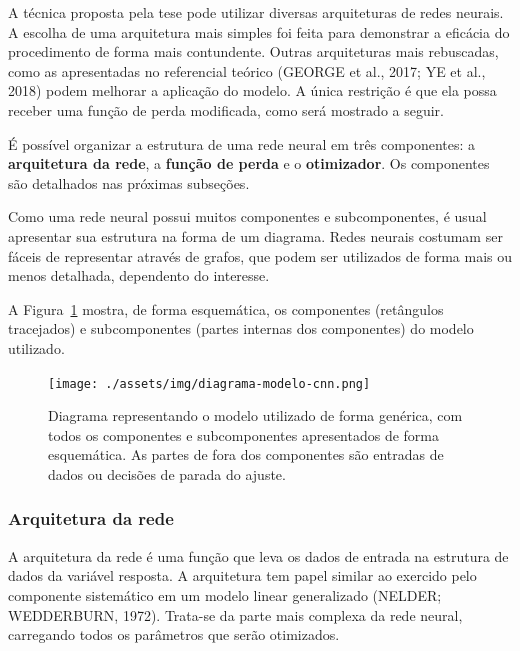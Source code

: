 \documentclass[12pt,twoside,brazilian]{book}
\begin{document}
A técnica proposta pela tese pode utilizar diversas arquiteturas de
redes neurais. A escolha de uma arquitetura mais simples foi feita para
demonstrar a eficácia do procedimento de forma mais contundente. Outras
arquiteturas mais rebuscadas, como as apresentadas no referencial
teórico (GEORGE et al., 2017; YE et al., 2018) podem melhorar a
aplicação do modelo. A única restrição é que ela possa receber uma
função de perda modificada, como será mostrado a seguir.

É possível organizar a estrutura de uma rede neural em três componentes:
a \textbf{arquitetura da rede}, a \textbf{função de perda} e o
\textbf{otimizador}. Os componentes são detalhados nas próximas
subseções.

Como uma rede neural possui muitos componentes e subcomponentes, é usual
apresentar sua estrutura na forma de um diagrama. Redes neurais costumam
ser fáceis de representar através de grafos, que podem ser utilizados de
forma mais ou menos detalhada, dependento do interesse.

A Figura~\ref{fig-diagrama-modelo-cnn} mostra, de forma esquemática, os
componentes (retângulos tracejados) e subcomponentes (partes internas
dos componentes) do modelo utilizado.

\begin{figure}

{\centering \texttt{[image: ./assets/img/diagrama-modelo-cnn.png]}

}

\caption{\label{fig-diagrama-modelo-cnn}Diagrama representando o modelo
utilizado de forma genérica, com todos os componentes e subcomponentes
apresentados de forma esquemática. As partes de fora dos componentes são
entradas de dados ou decisões de parada do ajuste.}

\end{figure}

\hypertarget{sec-arquitetura-rede}{%
\subsubsection{Arquitetura da rede}\label{sec-arquitetura-rede}}

A arquitetura da rede é uma função que leva os dados de entrada na
estrutura de dados da variável resposta. A arquitetura tem papel similar
ao exercido pelo componente sistemático em um modelo linear generalizado
(NELDER; WEDDERBURN, 1972). Trata-se da parte mais complexa da rede
neural, carregando todos os parâmetros que serão otimizados.
\end{document}
